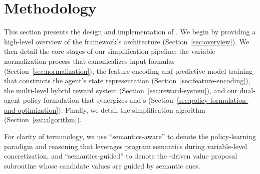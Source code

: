 \section{Methodology}
\label{sec:methodology}


This section presents the design and implementation of \tool. We begin by providing a high-level overview of the framework's architecture (Section~\ref{sec:overview}). We then detail the core stages of our simplification pipeline: the variable normalization process that canonicalizes input formulas (Section~\ref{sec:normalization}), the feature encoding and predictive model training that constructs the agent's state representation (Section~\ref{sec:feature-encoding}), the multi-level hybrid reward system (Section~\ref{sec:reward-system}), and our dual-agent policy formulation that synergizes \RL{} and \LLM{}s (Section~\ref{sec:policy-formulation-and-optimization}). Finally, we detail the simplification algorithm (Section~\ref{sec:algorithm}).

For clarity of terminology, we use ``semantics-aware'' to denote the policy-learning paradigm and reasoning that leverages program semantics during variable-level concretization, and ``semantics-guided'' to denote the \LLM{}-driven value proposal subroutine whose candidate values are guided by semantic cues.




